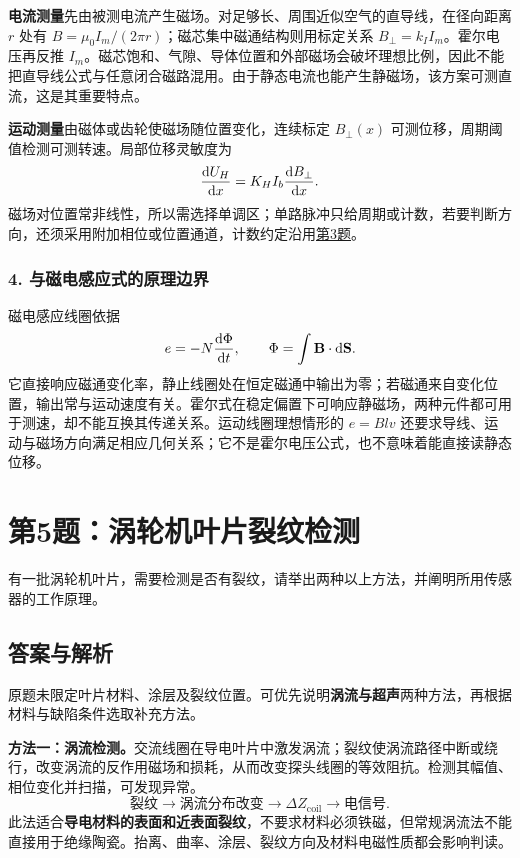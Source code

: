 \textbf{电流测量}先由被测电流产生磁场。对足够长、周围近似空气的直导线，在径向距离 $r$ 处有 $B=\mu_0I_m/(2\pi r)$；磁芯集中磁通结构则用标定关系 $B_\perp=k_I I_m$。霍尔电压再反推 $I_m$。磁芯饱和、气隙、导体位置和外部磁场会破坏理想比例，因此不能把直导线公式与任意闭合磁路混用。由于静态电流也能产生静磁场，该方案可测直流，这是其重要特点。

\textbf{运动测量}由磁体或齿轮使磁场随位置变化，连续标定 $B_\perp(x)$ 可测位移，周期阈值检测可测转速。局部位移灵敏度为
\[
\frac{\mathrm{d} U_H}{\mathrm{d} x}=K_HI_b\frac{\mathrm{d} B_\perp}{\mathrm{d} x}.
\]
磁场对位置常非线性，所以需选择单调区；单路脉冲只给周期或计数，若要判断方向，还须采用附加相位或位置通道，计数约定沿用\hyperref[kn:4-3]{第3题}。

\subsubsection*{4. 与磁电感应式的原理边界}
磁电感应线圈依据
\[
e=-N\frac{\mathrm{d}\Phi}{\mathrm{d} t},\qquad
\Phi=\int\mathbf B\cdot\mathrm{d}\mathbf S.
\]
它直接响应磁通变化率，静止线圈处在恒定磁通中输出为零；若磁通来自变化位置，输出常与运动速度有关。霍尔式在稳定偏置下可响应静磁场，两种元件都可用于测速，却不能互换其传递关系。运动线圈理想情形的 $e=Blv$ 还要求导线、运动与磁场方向满足相应几何关系；它不是霍尔电压公式，也不意味着能直接读静态位移。

\section{第5题：涡轮机叶片裂纹检测}
\label{hw:4-5}
\begin{hwquestion}
有一批涡轮机叶片，需要检测是否有裂纹，请举出两种以上方法，并阐明所用传感器的工作原理。
\end{hwquestion}

\subsection*{答案与解析}
原题未限定叶片材料、涂层及裂纹位置。可优先说明\textbf{涡流与超声}两种方法，再根据材料与缺陷条件选取补充方法。

\textbf{方法一：涡流检测。}交流线圈在导电叶片中激发涡流；裂纹使涡流路径中断或绕行，改变涡流的反作用磁场和损耗，从而改变探头线圈的等效阻抗。检测其幅值、相位变化并扫描，可发现异常。
\[
\text{裂纹}\longrightarrow\text{涡流分布改变}
\longrightarrow\Delta Z_{\mathrm{coil}}\longrightarrow\text{电信号}.
\]
此法适合\textbf{导电材料的表面和近表面裂纹}，不要求材料必须铁磁，但常规涡流法不能直接用于绝缘陶瓷。抬离、曲率、涂层、裂纹方向及材料电磁性质都会影响判读。

